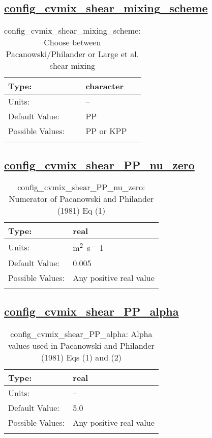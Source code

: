 \subsection[config\_cvmix\_shear\_mixing\_scheme]{\hyperref[sec:nm_tab_cvmix]{config\_cvmix\_shear\_mixing\_scheme}}
\label{subsec:nm_sec_config_cvmix_shear_mixing_scheme}
\begin{center}
\begin{longtable}{| p{2.0in} || p{4.0in} |}
    \hline
    Type: & character \\
    \hline
    Units: & -- \\
    \hline
    Default Value: & PP \\
    \hline
    Possible Values: & PP or KPP \\
    \hline
    \caption{config\_cvmix\_shear\_mixing\_scheme: Choose between Pacanowski/Philander or Large et al. shear mixing}
\end{longtable}
\end{center}
\subsection[config\_cvmix\_shear\_PP\_nu\_zero]{\hyperref[sec:nm_tab_cvmix]{config\_cvmix\_shear\_PP\_nu\_zero}}
\label{subsec:nm_sec_config_cvmix_shear_PP_nu_zero}
\begin{center}
\begin{longtable}{| p{2.0in} || p{4.0in} |}
    \hline
    Type: & real \\
    \hline
    Units: & \si{m^2.s^-1} \\
    \hline
    Default Value: & 0.005 \\
    \hline
    Possible Values: & Any positive real value \\
    \hline
    \caption{config\_cvmix\_shear\_PP\_nu\_zero: Numerator of Pacanowski and Philander (1981) Eq (1)}
\end{longtable}
\end{center}
\subsection[config\_cvmix\_shear\_PP\_alpha]{\hyperref[sec:nm_tab_cvmix]{config\_cvmix\_shear\_PP\_alpha}}
\label{subsec:nm_sec_config_cvmix_shear_PP_alpha}
\begin{center}
\begin{longtable}{| p{2.0in} || p{4.0in} |}
    \hline
    Type: & real \\
    \hline
    Units: & -- \\
    \hline
    Default Value: & 5.0 \\
    \hline
    Possible Values: & Any positive real value \\
    \hline
    \caption{config\_cvmix\_shear\_PP\_alpha: Alpha values used in Pacanowski and Philander (1981) Eqs (1) and (2)}
\end{longtable}
\end{center}
